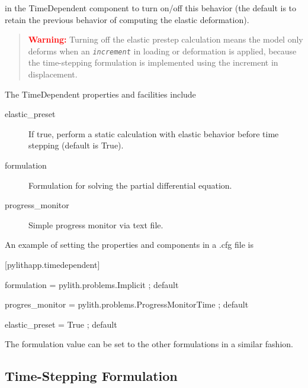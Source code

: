 in the TimeDependent component to turn on/off this behavior (the default
is to retain the previous behavior of computing the elastic deformation). 
\begin{quote}
\textbf{\textcolor{red}{Warning:}}\textbf{ }Turning off the elastic
prestep calculation means the model only deforms when an \texttt{\textit{increment}}
in loading or deformation is applied, because the time-stepping formulation
is implemented using the increment in displacement.
\end{quote}
The TimeDependent properties and facilities include
\begin{description}
\item [{elastic\_preset}] If true, perform a static calculation with elastic
behavior before time stepping (default is True).
\item [{formulation}] Formulation for solving the partial differential
equation.
\item [{progress\_monitor}] Simple progress monitor via text file.
\end{description}
An example of setting the properties and components in a .cfg file
is
\begin{lyxcode}
{[}pylithapp.timedependent{]}

formulation = pylith.problems.Implicit ; default

progres\_monitor = pylith.problems.ProgressMonitorTime ; default

elastic\_preset = True ; default
\end{lyxcode}
The formulation value can be set to the other formulations in a similar
fashion. 


\subsection{Time-Stepping Formulation}

